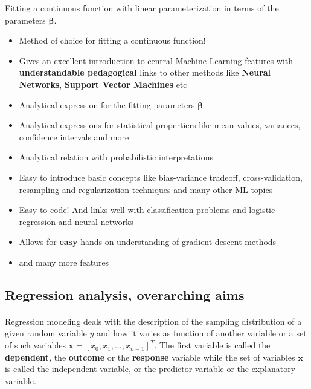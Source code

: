 \documentclass[%
oneside,                 %
final,                   %
10pt]{article}
\begin{document}
Fitting a continuous function with linear parameterization in terms of the parameters  $\bm{\beta}$.
\begin{itemize}
\item Method of choice for fitting a continuous function!

\item Gives an excellent introduction to central Machine Learning features with \textbf{understandable pedagogical} links to other methods like \textbf{Neural Networks}, \textbf{Support Vector Machines} etc

\item Analytical expression for the fitting parameters $\bm{\beta}$

\item Analytical expressions for statistical propertiers like mean values, variances, confidence intervals and more

\item Analytical relation with probabilistic interpretations 

\item Easy to introduce basic concepts like bias-variance tradeoff, cross-validation, resampling and regularization techniques and many other ML topics

\item Easy to code! And links well with classification problems and logistic regression and neural networks

\item Allows for \textbf{easy} hands-on understanding of gradient descent methods

\item and many more features
\end{itemize}

\noindent
\subsection{Regression analysis, overarching aims}

\paragraph{}

Regression modeling deals with the description of  the sampling distribution of a given random variable $y$ and how it varies as function of another variable or a set of such variables $\bm{x} =[x_0, x_1,\dots, x_{n-1}]^T$. 
The first variable is called the \textbf{dependent}, the \textbf{outcome} or the \textbf{response} variable while the set of variables $\bm{x}$ is called the independent variable, or the predictor variable or the explanatory variable. 
\end{document}
